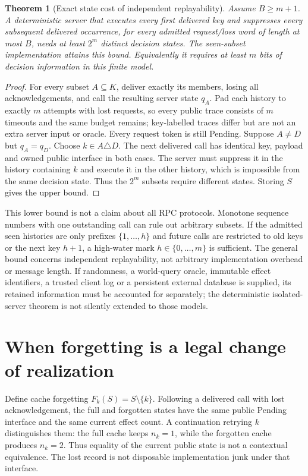 \documentclass[11pt]{article}
\newtheorem{theorem}{Theorem}
\begin{document}
\begin{theorem}[Exact state cost of independent replayability]
Assume $B\ge m+1$. A deterministic server that executes every first delivered key and suppresses every subsequent delivered occurrence, for every admitted request/loss word of length at most $B$, needs at least $2^m$ distinct decision states. The seen-subset implementation attains this bound. Equivalently it requires at least $m$ bits of decision information in this finite model.
\end{theorem}
\begin{proof}
For every subset $A\subseteq K$, deliver exactly its members, losing all acknowledgements, and call the resulting server state $q_A$. Pad each history to exactly $m$ attempts with lost requests, so every public trace consists of $m$ timeouts and the same budget remains; key-labelled traces differ but are not an extra server input or oracle. Every request token is still Pending. Suppose $A\ne D$ but $q_A=q_D$. Choose $k\in A\triangle D$. The next delivered call has identical key, payload and owned public interface in both cases. The server must suppress it in the history containing $k$ and execute it in the other history, which is impossible from the same decision state. Thus the $2^m$ subsets require different states. Storing $S$ gives the upper bound.\end{proof}

This lower bound is not a claim about all RPC protocols. Monotone sequence numbers with one outstanding call can rule out arbitrary subsets. If the admitted seen histories are only prefixes $\{1,\ldots,h\}$ and future calls are restricted to old keys or the next key $h+1$, a high-water mark $h\in\{0,\ldots,m\}$ is sufficient. The general bound concerns independent replayability, not arbitrary implementation overhead or message length. If randomness, a world-query oracle, immutable effect identifiers, a trusted client log or a persistent external database is supplied, its retained information must be accounted for separately; the deterministic isolated-server theorem is not silently extended to those models.

\section{When forgetting is a legal change of realization}
Define cache forgetting $F_k(S)=S\setminus\{k\}$. Following a delivered call with lost acknowledgement, the full and forgotten states have the same public Pending interface and the same current effect count. A continuation retrying $k$ distinguishes them: the full cache keeps $n_k=1$, while the forgotten cache produces $n_k=2$. Thus equality of the current public state is not a contextual equivalence. The lost record is not disposable implementation junk under that interface.
\end{document}
